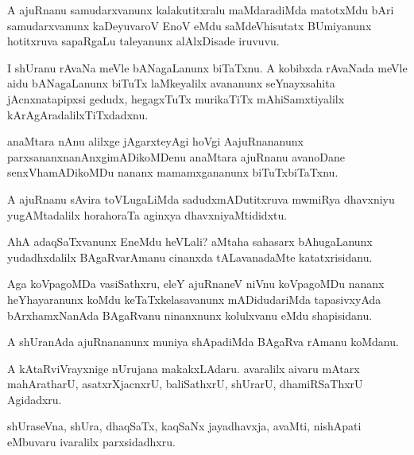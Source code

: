 \documentclass{article}
\begin{document}
\begin{mn}
A ajuRnanu samudarxvanunx kalakutitxralu maMdaradiMda matotxMdu bAri
samudarxvanunx kaDeyuvaroV EnoV eMdu saMdeVhisutatx BUmiyanunx
hotitxruva sapaRgaLu taleyanunx alAlxDisade iruvuvu.
\end{mn}

\begin{mn}%
I shUranu rAvaNa meVle bANagaLanunx biTaTxnu. A kobibxda rAvaNada
meVle aidu bANagaLanunx biTuTx laMkeyalilx avananunx seYnayxsahita
jAcnxnatapipxsi gedudx, hegagxTuTx murikaTiTx mAhiSamxtiyalilx
kArAgAradalilxTiTxdadxnu.
\end{mn}

\begin{mn}%
anaMtara nAnu alilxge jAgarxteyAgi hoVgi AajuRnananunx
parxsananxnanAnxgimADikoMDenu anaMtara ajuRnanu avanoDane
senxVhamADikoMDu nananx mamamxgananunx biTuTxbiTaTxnu.
\end{mn}

\begin{mn}
A ajuRnanu sAvira toVLugaLiMda sadudxmADutitxruva mwmiRya dhavxniyu
yugAMtadalilx horahoraTa aginxya dhavxniyaMtididxtu.
\end{mn}

\begin{mn}
AhA adaqSaTxvanunx EneMdu heVLali? aMtaha sahasarx bAhugaLanunx
yudadhxdalilx BAgaRvarAmanu cinanxda tALavanadaMte katatxrisidanu.
\end{mn}

\begin{mn}%
Aga koVpagoMDa vasiSathxru, eleY ajuRnaneV niVnu koVpagoMDu nananx
heYhayaranunx koMdu keTaTxkelasavanunx mADidudariMda tapasivxyAda
bArxhamxNanAda BAgaRvanu ninanxnunx kolulxvanu eMdu shapisidanu.
\end{mn}

\begin{mn}%
A shUranAda ajuRnananunx muniya shApadiMda BAgaRva rAmanu koMdanu.
\end{mn}

\begin{mn}
A kAtaRviVrayxnige nUrujana makakxLAdaru. avaralilx aivaru mAtarx
mahAratharU, asatxrXjacnxrU, baliSathxrU, shUrarU, dhamiRSaThxrU Agidadxru.
\end{mn}

\begin{mn}
shUraseVna, shUra, dhaqSaTx, kaqSaNx jayadhavxja, avaMti, nishApati
eMbuvaru ivaralilx parxsidadhxru.
\end{mn}
\end{document}
